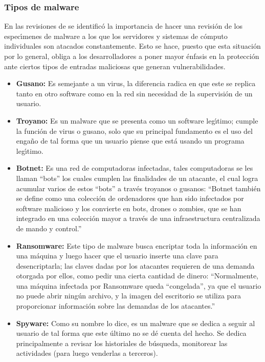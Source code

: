 \subsubsection{Tipos de malware}

En las revisiones de \textcite{Mosquera2019} se identific\'o la importancia de
hacer una revisi\'on de los espec\'{\i}menes de malware a los que los servidores y
sistemas de c\'omputo individuales son atacados constantemente. Esto se hace,
puesto que esta situaci\'on por lo general, obliga a los desarrolladores a poner
mayor \'enfasis en la protecci\'on ante ciertos tipos de entradas maliciosas que
generan vulnerabilidades.

\begin{itemize}
	\item \textbf{Gusano:}
	      Es semejante a un virus, la diferencia radica en que este se replica tanto
	      en otro software como en la red sin necesidad de la supervisi\'on de un
	      usuario. \parencite{Rosli2019}

	\item \textbf{Troyano:}
	      Es un malware que se presenta como un software leg\'{\i}timo; cumple la funci\'on
	      de virus o gusano, solo que su principal fundamento es el uso del enga\~no de
	      tal forma que un usuario piense que est\'a usando un programa leg\'{\i}timo.
	      \parencite{Rosli2019}

	\item \textbf{Botnet:}
	      Es una red de computadoras infectadas, tales computadoras se les llaman
	      ``bots'' los cuales cumplen las finalidades de un atacante, el cual logra
	      acumular varios de estos ``bots'' a trav\'es troyanos o gusanos: ``Botnet
	      tambi\'en se define como una colecci\'on de ordenadores que han sido infectados
	      por software malicioso y los convierte en bots, drones o zombies, que se han
	      integrado en una colecci\'on mayor a trav\'es de una infraestructura
	      centralizada de mando y control.'' \parencite{Rosli2019}

	\item \textbf{Ransomware:}
	      Este tipo de malware busca encriptar toda la informaci\'on en una m\'aquina y
	      luego hacer que el usuario inserte una clave para desencriptarla; las claves
	      dadas por los atacantes requieren de una demanda otorgada por ellos, como
	      pedir una cierta cantidad de dinero: ``Normalmente, una m\'aquina infectada
	      por Ransomware queda ``congelada'', ya que el usuario no puede abrir ning\'un
	      archivo, y la imagen del escritorio se utiliza para proporcionar informaci\'on
	      sobre las demandas de los atacantes.'' \parencite{Rosli2019}

	\item \textbf{Spyware:}
	      Como su nombre lo dice, es un malware que se dedica a seguir al usuario de
	      tal forma que este \'ultimo no se d\'e cuenta del hecho. Se dedica
	      principalmente a revisar los historiales de b\'usqueda, monitorear las
	      actividades (para luego venderlas a terceros).
	      \parencite{Rosli2019}
\end{itemize}

